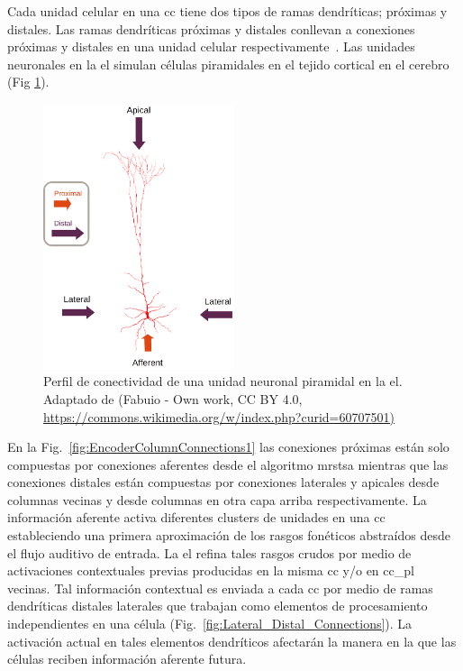 {Cada unidad celular en una \gls{cc} tiene dos tipos de ramas dendríticas; próximas y distales. Las ramas dendríticas próximas y distales conllevan a conexiones próximas y distales en una unidad celular respectivamente~\cite{10.1371/journal.pone.0217966}.
Las unidades neuronales en la \gls{el} simulan células piramidales en el tejido cortical en el cerebro (Fig \ref{fig:Pyramidal_Cell}).

\begin{figure}[h!]
    \centering
    \includegraphics[width=0.5\textwidth]{Pyramidal_Cell.png}
    \caption{Perfil de conectividad de una unidad neuronal piramidal en la \gls{el}. Adaptado de (Fabuio - Own work, CC BY 4.0, \protect\url{https://commons.wikimedia.org/w/index.php?curid=60707501)}}
    \label{fig:Pyramidal_Cell}
\end{figure}

En la Fig.~\ref{fig:EncoderColumnConnections1} las conexiones próximas están solo compuestas por conexiones aferentes desde el algoritmo \gls{mrstsa} mientras que las conexiones distales están compuestas por conexiones laterales y apicales desde columnas vecinas y desde columnas en otra capa arriba respectivamente.
La información aferente activa diferentes clusters de unidades en una \gls{cc} estableciendo una primera aproximación de los rasgos fonéticos abstraídos desde el flujo auditivo de entrada. 
La \gls{el} refina tales rasgos crudos por medio de activaciones contextuales previas producidas en la misma \gls{cc} y/o en \gls{cc_pl} vecinas.
Tal información contextual es enviada a cada \gls{cc} por medio de ramas dendríticas distales laterales que trabajan como elementos de procesamiento independientes en una célula (Fig.~\ref{fig:Lateral_Distal_Connections}).
La activación actual en tales elementos dendríticos afectarán la manera en la que las células reciben información aferente futura.

}
